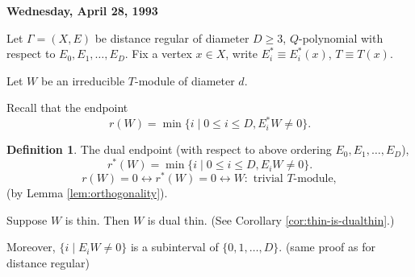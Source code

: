 \documentclass[
]{book}
\theoremstyle{definition}
\newtheorem{definition}{Definition}[chapter]
\theoremstyle{definition}
\theoremstyle{definition}
\theoremstyle{definition}
\theoremstyle{remark}
\begin{document}
\textbf{Wednesday, April 28, 1993}

Let \(\Gamma = (X, E)\) be distance regular of diameter \(D\geq 3\), \(Q\)-polynomial with respect to \(E_0, E_1, \ldots, E_D\). Fix a vertex \(x\in X\), write \(E^*_i\equiv E^*_i(x)\), \(T\equiv T(x)\).

Let \(W\) be an irreducible \(T\)-module of diameter \(d\).

Recall that the endpoint
\[r(W) = \min\{i\mid 0\leq i\leq D, E^*_iW \neq 0\}.\]

\begin{definition}
\protect\hypertarget{def:dual-endpoint}{}\label{def:dual-endpoint}The dual endpoint  (with respect to above ordering \(E_0, E_1, \ldots, E_D\)),
\[r^*(W) = \min\{i\mid 0\leq i\leq D, E_iW \neq 0\}.\]
\[r(W) = 0 \leftrightarrow r^*(W) = 0 \leftrightarrow W: \text{ trivial $T$-module},\]
(by Lemma \ref{lem:orthogonality}).
\end{definition}

Suppose \(W\) is thin. Then \(W\) is dual thin.
(See Corollary \ref{cor:thin-is-dualthin}.)

Moreover, \(\{i\mid E_iW \neq 0\}\) is a subinterval of \(\{0, 1, \ldots, D\}\). (same proof as for distance regular)
\end{document}
